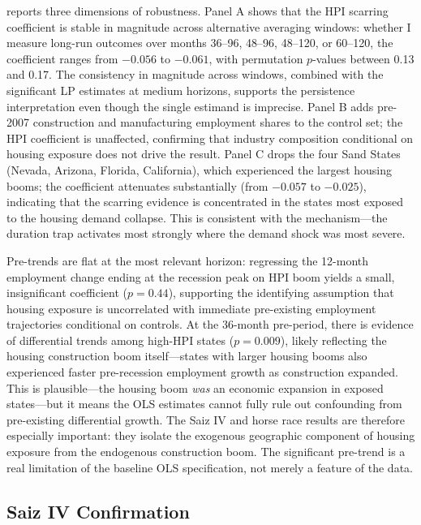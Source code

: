 \documentclass[12pt]{article}
\begin{document}
 reports three dimensions of robustness. Panel A shows that the HPI scarring coefficient is stable in magnitude across alternative averaging windows: whether I measure long-run outcomes over months 36--96, 48--96, 48--120, or 60--120, the coefficient ranges from $-0.056$ to $-0.061$, with permutation $p$-values between 0.13 and 0.17. The consistency in magnitude across windows, combined with the significant LP estimates at medium horizons, supports the persistence interpretation even though the single estimand is imprecise. Panel B adds pre-2007 construction and manufacturing employment shares to the control set; the HPI coefficient is unaffected, confirming that industry composition conditional on housing exposure does not drive the result. Panel C drops the four Sand States (Nevada, Arizona, Florida, California), which experienced the largest housing booms; the coefficient attenuates substantially (from $-0.057$ to $-0.025$), indicating that the scarring evidence is concentrated in the states most exposed to the housing demand collapse. This is consistent with the mechanism---the duration trap activates most strongly where the demand shock was most severe.

Pre-trends are flat at the most relevant horizon: regressing the 12-month employment change ending at the recession peak on HPI boom yields a small, insignificant coefficient ($p = 0.44$), supporting the identifying assumption that housing exposure is uncorrelated with immediate pre-existing employment trajectories conditional on controls. At the 36-month pre-period, there is evidence of differential trends among high-HPI states ($p = 0.009$), likely reflecting the housing construction boom itself---states with larger housing booms also experienced faster pre-recession employment growth as construction expanded. This is plausible---the housing boom \textit{was} an economic expansion in exposed states---but it means the OLS estimates cannot fully rule out confounding from pre-existing differential growth. The Saiz IV and horse race results are therefore especially important: they isolate the exogenous geographic component of housing exposure from the endogenous construction boom. The significant pre-trend is a real limitation of the baseline OLS specification, not merely a feature of the data.

\subsection{Saiz IV Confirmation}
\end{document}
